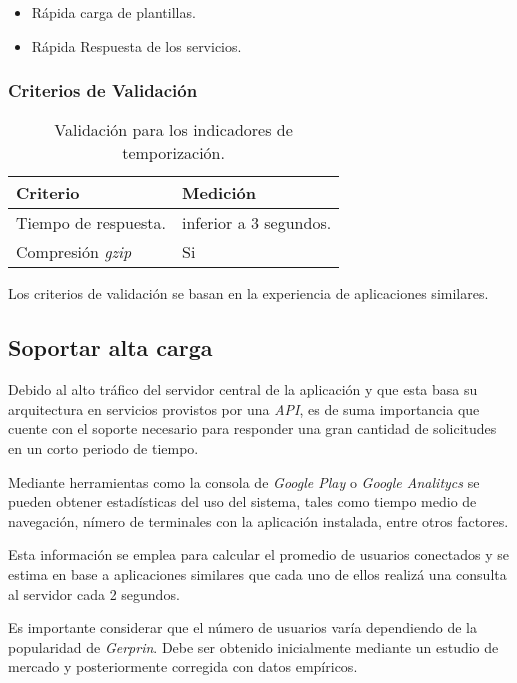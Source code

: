 \begin{itemize}
	\item
	Rápida carga de plantillas.
	\item
	Rápida Respuesta de los servicios.
\end{itemize}

\subsubsection{Criterios de Validación}

\begin{table}[H]
    \caption[Validación para los indicadores de temporización.] {Validación para los indicadores de temporización.}
    \label{tbl:Criterios de Validación temporización}
    \begin{tabular}{|p{}|p{}|}
        \hline
        \textbf{Criterio} &  \textbf{Medición}\\
    	\hline
    	\hline
    	Tiempo de respuesta.  & inferior a 3 segundos. \\ \hline
		Compresión \emph{gzip}   & Si \\ 
        \hline
    \end{tabular}
\end{table}
Los criterios de validación se basan en la experiencia de aplicaciones similares.

\subsection{Soportar alta carga}

Debido al alto tráfico del servidor central de la aplicación y que esta basa su arquitectura en servicios provistos por una \emph{API}, es de suma importancia que cuente con el soporte necesario para responder una gran cantidad de solicitudes en un corto periodo de tiempo.

Mediante herramientas como la consola de \emph{Google Play} o \emph{ Google Analitycs} se pueden obtener estadísticas del uso del sistema, tales como tiempo medio de navegación, nímero de terminales con la aplicación instalada, entre otros factores.

Esta información se emplea para calcular el promedio de usuarios conectados y se estima en base a aplicaciones similares que cada uno de ellos realizá  una consulta al servidor cada 2 segundos.

Es importante considerar que el número de usuarios varía dependiendo de la popularidad de \emph{Gerprin}. Debe ser obtenido inicialmente mediante un estudio de mercado y posteriormente corregida con datos empíricos.


